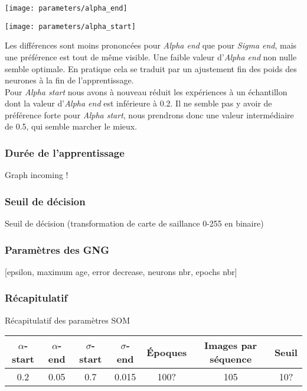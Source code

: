 	\begin{figureth}
		\begin{subfigureth}{.75\textwidth}
			\texttt{[image: parameters/alpha\_end]}	
		\end{subfigureth}
		\begin{subfigureth}{.75\textwidth}
			\texttt{[image: parameters/alpha\_start]}	
		\end{subfigureth}
		\caption[Optimisation d'$\alpha$]{Les différences sont moins prononcées pour \textit{Alpha end} que pour \textit{Sigma end}, mais une préférence est tout de même visible. Une faible valeur d'\textit{Alpha end} non nulle semble optimale. En pratique cela se traduit par un ajustement fin des poids des neurones à la fin de l'apprentissage.\\
		
		Pour \textit{Alpha start} nous avons à nouveau réduit les expériences à un échantillon dont la valeur d'\textit{Alpha end} est inférieure à 0.2. Il ne semble pas y avoir de préférence forte pour \textit{Alpha start}, nous prendrons donc une valeur intermédiaire de 0.5, qui semble marcher le mieux.}\label{fig:params:alphaopt}
	\end{figureth}


	\subsubsection{Durée de l'apprentissage}

	Graph incoming !

	\subsubsection{Seuil de décision}

	Seuil de décision (transformation de carte de saillance 0-255 en binaire)

	\subsubsection{Paramètres des GNG}

	[epsilon, maximum age, error decrease, neurons nbr, epochs nbr]

	\subsubsection{Récapitulatif}

	\begin{tableth}
	\label{tab:recap:param}
	\caption[Récapitulatif des paramètres SOM]{Récapitulatif des paramètres SOM}
	\begin{tabular}{|cc|cc|c|c|c|}
		\hline
		$\alpha$-start	& $\alpha$-end & $\sigma$-start & $\sigma$-end & Époques & Images par séquence & Seuil\\
		\hline
		0.2 & 0.05 & 0.7 & 0.015 & 100? & 105 & 10?\\
		\hline
	\end{tabular}
	\end{tableth}


